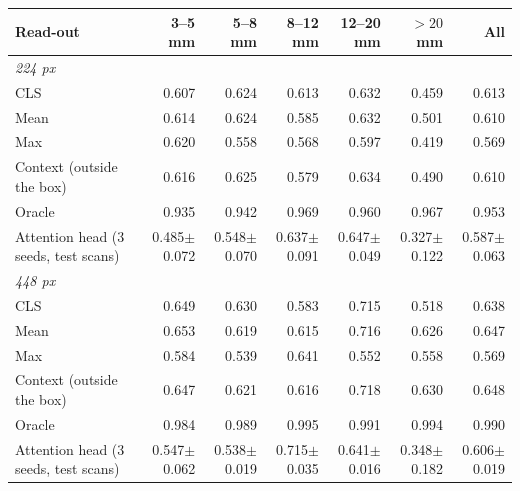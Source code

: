 \begin{tabular}{lrrrrrr}
\toprule
Read-out & 3--5 mm & 5--8 mm & 8--12 mm & 12--20 mm & $>20$ mm & All \\
\midrule
\multicolumn{7}{l}{\emph{224 px}} \\
CLS & 0.607 & 0.624 & 0.613 & 0.632 & 0.459 & 0.613 \\
Mean & 0.614 & 0.624 & 0.585 & 0.632 & 0.501 & 0.610 \\
Max & 0.620 & 0.558 & 0.568 & 0.597 & 0.419 & 0.569 \\
Context (outside the box) & 0.616 & 0.625 & 0.579 & 0.634 & 0.490 & 0.610 \\
Oracle & 0.935 & 0.942 & 0.969 & 0.960 & 0.967 & 0.953 \\
Attention head (3 seeds, test scans) & 0.485$\pm$0.072 & 0.548$\pm$0.070 & 0.637$\pm$0.091 & 0.647$\pm$0.049 & 0.327$\pm$0.122 & 0.587$\pm$0.063 \\
\multicolumn{7}{l}{\emph{448 px}} \\
CLS & 0.649 & 0.630 & 0.583 & 0.715 & 0.518 & 0.638 \\
Mean & 0.653 & 0.619 & 0.615 & 0.716 & 0.626 & 0.647 \\
Max & 0.584 & 0.539 & 0.641 & 0.552 & 0.558 & 0.569 \\
Context (outside the box) & 0.647 & 0.621 & 0.616 & 0.718 & 0.630 & 0.648 \\
Oracle & 0.984 & 0.989 & 0.995 & 0.991 & 0.994 & 0.990 \\
Attention head (3 seeds, test scans) & 0.547$\pm$0.062 & 0.538$\pm$0.019 & 0.715$\pm$0.035 & 0.641$\pm$0.016 & 0.348$\pm$0.182 & 0.606$\pm$0.019 \\
\bottomrule
\end{tabular}
